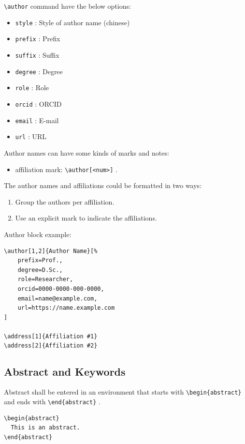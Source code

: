 \documentclass[%
]{ceurart}
\begin{document}
\verb|\author|
command have the below options:
\begin{itemize}
\item
\verb|style|
 : Style of author name (chinese)
\item
\verb|prefix|
 : Prefix
\item
\verb|suffix|
 : Suffix
\item
\verb|degree|
 : Degree
\item
\verb|role|
 : Role
\item
\verb|orcid|
 : ORCID
\item
\verb|email|
 : E-mail
\item
\verb|url|
 : URL
\end{itemize}

Author names can have some kinds of marks and notes:
\begin{itemize}
\item affiliation mark:
\verb|\author[<num>]|
.
\end{itemize}

The author names and affiliations could be formatted in two ways:
\begin{enumerate}
\item Group the authors per affiliation.
\item Use an explicit mark to indicate the affiliations.
\end{enumerate}

Author block example:
\begin{lstlisting}[language={[latex]TeX}]
\author[1,2]{Author Name}[%
    prefix=Prof.,
    degree=D.Sc.,
    role=Researcher,
    orcid=0000-0000-000-0000,
    email=name@example.com,
    url=https://name.example.com
]

\address[1]{Affiliation #1}
\address[2]{Affiliation #2}
\end{lstlisting}

\subsection{Abstract and Keywords}

Abstract shall be entered in an environment that starts with
\verb|\begin{abstract}|
 and ends with
\verb|\end{abstract}|
.

\begin{lstlisting}[language={[latex]TeX}]
\begin{abstract}
  This is an abstract.
\end{abstract}
\end{lstlisting}
\end{document}

